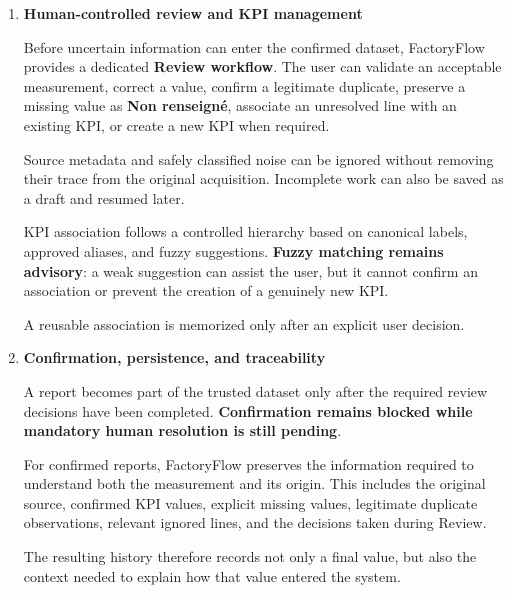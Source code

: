 \begin{enumerate}[label=\textbf{\arabic*.}]
    The interpretation stage keeps the following states distinguishable:
    recognized measurements, ambiguous values, explicit missing information,
    duplicate observations, unresolved KPI-like content, and safely identified
    source noise.

    This separation is essential because information with different semantic
    meaning must not follow the same validation path.


    \item \textbf{Human-controlled review and KPI management}

    Before uncertain information can enter the confirmed dataset, FactoryFlow
    provides a dedicated \textbf{Review workflow}. The user can validate an
    acceptable measurement, correct a value, confirm a legitimate duplicate,
    preserve a missing value as \textbf{Non renseigné}, associate an
    unresolved line with an existing KPI, or create a new KPI when required.

    Source metadata and safely classified noise can be ignored without
    removing their trace from the original acquisition. Incomplete work can
    also be saved as a draft and resumed later.

    KPI association follows a controlled hierarchy based on canonical labels,
    approved aliases, and fuzzy suggestions. \textbf{Fuzzy matching remains
    advisory}: a weak suggestion can assist the user, but it cannot confirm an
    association or prevent the creation of a genuinely new KPI.

    A reusable association is memorized only after an explicit user decision.


    \item \textbf{Confirmation, persistence, and traceability}

    A report becomes part of the trusted dataset only after the required
    review decisions have been completed. \textbf{Confirmation remains
    blocked while mandatory human resolution is still pending}.

    For confirmed reports, FactoryFlow preserves the information required to
    understand both the measurement and its origin. This includes the original
    source, confirmed KPI values, explicit missing values, legitimate duplicate
    observations, relevant ignored lines, and the decisions taken during
    Review.

    The resulting history therefore records not only a final value, but also
    the context needed to explain how that value entered the system.



\end{enumerate}
